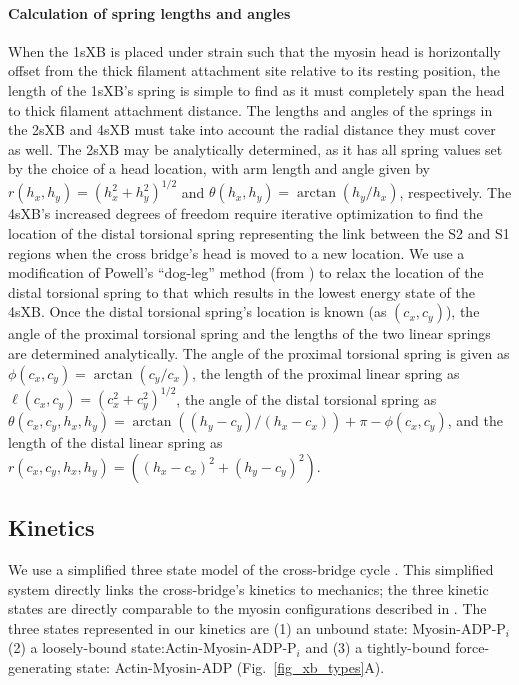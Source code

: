 \documentclass[]{article}
\begin{document}
\paragraph{Calculation of spring lengths and angles} %
When the 1sXB is placed under strain such that the myosin head is horizontally offset from the thick filament attachment site relative to its resting position, the length of the 1sXB's spring is simple to find as it must completely span the head to thick filament attachment distance.
The lengths and angles of the springs in the 2sXB and 4sXB must take into account the radial distance they must cover as well.
The 2sXB may be analytically determined, as it has all spring values set by the choice of a head location, with arm length and angle given by $r(h_x, h_y)=(h_x^2 + h_y^2)^{1/2}$ and $\theta(h_x, h_y)=\arctan(h_y/h_x)$, respectively.
The 4sXB's increased degrees of freedom require iterative optimization to find the location of the distal torsional spring representing the link between the S2 and S1 regions when the cross bridge's head is moved to a new location.
We use a modification of Powell's ``dog-leg'' method (from \citet{SciPy}) to relax the location of the distal torsional spring to that which results in the lowest energy state of the 4sXB.
Once the distal torsional spring's location is known (as $(c_x, c_y)$), the angle of the proximal torsional spring and the lengths of the two linear springs are determined analytically.
The angle of the proximal torsional spring is given as $\phi(c_x, c_y)=\arctan(c_y/c_x)$, the length of the proximal linear spring as $\ell(c_x, c_y)=(c_x^2 + c_y^2)^{1/2}$, the angle of the distal torsional spring as $\theta(c_x, c_y, h_x, h_y) = \arctan((h_y-c_y)/(h_x-c_x)) + \pi - \phi(c_x, c_y)$, and the length of the distal linear spring as $r(c_x, c_y, h_x, h_y)=((h_x-c_x)^2 + (h_y-c_y)^2)$.

\subsection*{Kinetics} %

We use a simplified three state model of the cross-bridge cycle \citep{Pate1989, Tanner2007}. 
This simplified system directly links the cross-bridge's kinetics to mechanics; the three kinetic states are directly comparable to the myosin configurations described in \citet{Houdusse2000}.
The three states represented in our kinetics are (1) an unbound state: Myosin-ADP-P$_i$ (2) a loosely-bound state:Actin-Myosin-ADP-P$_i$ and (3) a tightly-bound force-generating state: Actin-Myosin-ADP (Fig.~\ref{fig_xb_types}A).
\end{document}
